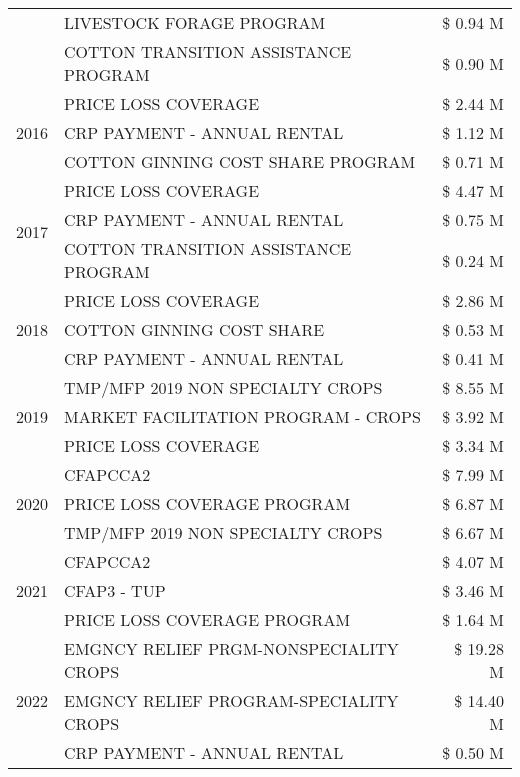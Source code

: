 \begin{tabular}{llr}
 & LIVESTOCK FORAGE PROGRAM & \$ 0.94 M \\
 & COTTON TRANSITION ASSISTANCE PROGRAM & \$ 0.90 M \\
\cline{1-3}
\multirow[t]{3}{*}{2016} & PRICE LOSS COVERAGE & \$ 2.44 M \\
 & CRP PAYMENT - ANNUAL RENTAL & \$ 1.12 M \\
 & COTTON GINNING COST SHARE PROGRAM & \$ 0.71 M \\
\cline{1-3}
\multirow[t]{3}{*}{2017} & PRICE LOSS COVERAGE & \$ 4.47 M \\
 & CRP PAYMENT - ANNUAL RENTAL & \$ 0.75 M \\
 & COTTON TRANSITION ASSISTANCE PROGRAM & \$ 0.24 M \\
\cline{1-3}
\multirow[t]{3}{*}{2018} & PRICE LOSS COVERAGE & \$ 2.86 M \\
 & COTTON GINNING COST SHARE & \$ 0.53 M \\
 & CRP PAYMENT - ANNUAL RENTAL & \$ 0.41 M \\
\cline{1-3}
\multirow[t]{3}{*}{2019} & TMP/MFP 2019 NON SPECIALTY CROPS & \$ 8.55 M \\
 & MARKET FACILITATION PROGRAM - CROPS & \$ 3.92 M \\
 & PRICE LOSS COVERAGE & \$ 3.34 M \\
\cline{1-3}
\multirow[t]{3}{*}{2020} & CFAPCCA2 & \$ 7.99 M \\
 & PRICE LOSS COVERAGE PROGRAM & \$ 6.87 M \\
 & TMP/MFP 2019 NON SPECIALTY CROPS & \$ 6.67 M \\
\cline{1-3}
\multirow[t]{3}{*}{2021} & CFAPCCA2 & \$ 4.07 M \\
 & CFAP3 - TUP & \$ 3.46 M \\
 & PRICE LOSS COVERAGE PROGRAM & \$ 1.64 M \\
\cline{1-3}
\multirow[t]{3}{*}{2022} & EMGNCY RELIEF PRGM-NONSPECIALITY CROPS & \$ 19.28 M \\
 & EMGNCY RELIEF PROGRAM-SPECIALITY CROPS & \$ 14.40 M \\
 & CRP PAYMENT - ANNUAL RENTAL & \$ 0.50 M \\
\cline{1-3}
\bottomrule
\end{tabular}
